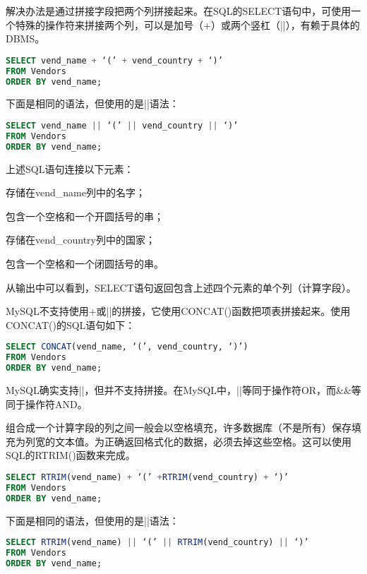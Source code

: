 解决办法是通过拼接字段把两个列拼接起来。在SQL的SELECT语句中，可使用一个特殊的操作符来拼接两个列，可以是加号（+）或两个竖杠（||），有赖于具体的DBMS。

\begin{lstlisting}[language=SQL]
SELECT vend_name + ‘(’ + vend_country + ‘)’
FROM Vendors
ORDER BY vend_name;
\end{lstlisting}

下面是相同的语法，但使用的是||语法：

\begin{lstlisting}[language=SQL]
SELECT vend_name || ‘(’ || vend_country || ‘)’
FROM Vendors
ORDER BY vend_name;
\end{lstlisting}

上述SQL语句连接以下元素：

\begin{compactitem}
\item 存储在vend\_name列中的名字；
\item 包含一个空格和一个开圆括号的串；
\item 存储在vend\_country列中的国家；
\item 包含一个空格和一个闭圆括号的串。
\end{compactitem}


从输出中可以看到，SELECT语句返回包含上述四个元素的单个列（计算字段）。

MySQL不支持使用+或||的拼接，它使用CONCAT()函数把项表拼接起来。使用CONCAT()的SQL语句如下：

\begin{lstlisting}[language=SQL]
SELECT CONCAT(vend_name, ‘(’, vend_country, ‘)’)
FROM Vendors
ORDER BY vend_name;
\end{lstlisting}

MySQL确实支持||，但并不支持拼接。在MySQL中，||等同于操作符OR，而\&\&等同于操作符AND。

组合成一个计算字段的列之间一般会以空格填充，许多数据库（不是所有）保存填充为列宽的文本值。为正确返回格式化的数据，必须去掉这些空格。这可以使用SQL的RTRIM()函数来完成。

\begin{lstlisting}[language=SQL]
SELECT RTRIM(vend_name) + ‘(’ +RTRIM(vend_country) + ‘)’
FROM Vendors
ORDER BY vend_name;
\end{lstlisting}

下面是相同的语法，但使用的是||语法：

\begin{lstlisting}[language=SQL]
SELECT RTRIM(vend_name) || ‘(’ || RTRIM(vend_country) || ‘)’
FROM Vendors
ORDER BY vend_name;
\end{lstlisting}

